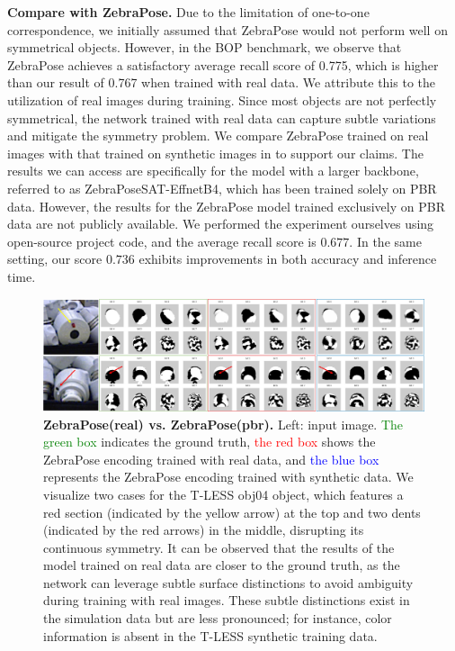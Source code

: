 \textbf{Compare with ZebraPose.} Due to the limitation of one-to-one correspondence, we initially assumed that ZebraPose would not perform well on symmetrical objects. However, in the BOP benchmark, we observe that ZebraPose achieves a satisfactory average recall score of 0.775, which is higher than our result of 0.767 when trained with real data. We attribute this to the utilization of real images during training. Since most objects are not perfectly symmetrical, the network trained with real data can capture subtle variations and mitigate the symmetry problem. We compare ZebraPose trained on real images with that trained on synthetic images in  to support our claims. The results we can access are specifically for the model with a larger backbone, referred to as ZebraPoseSAT-EffnetB4, which has been trained solely on PBR data. However, the results for the ZebraPose model trained exclusively on PBR data are not publicly available. We performed the experiment ourselves using open-source project code, and the average recall score is $0.677$. In the same setting, our score $0.736$ exhibits improvements in both accuracy and inference time.
\begin{figure}[ht]
        \centerline{\includegraphics[width=1.0\textwidth]{figure/symnet/vis_zebrapose_gt_real_pbr_support.jpg}}
        \caption{\textbf{ZebraPose(real) vs. ZebraPose(pbr).} Left: input image. \textcolor{green}{The green box} indicates the ground truth, \textcolor{red}{the red box} shows the ZebraPose encoding trained with real data, and \textcolor{blue}{the blue box} represents the ZebraPose encoding trained with synthetic data. We visualize two cases for the T-LESS obj04 object, which features a red section (indicated by the yellow arrow) at the top and two dents (indicated by the red arrows) in the middle, disrupting its continuous symmetry. It can be observed that the results of the model trained on real data are closer to the ground truth, as the network can leverage subtle surface distinctions to avoid ambiguity during training with real images. These subtle distinctions exist in the simulation data but are less pronounced; for instance, color information is absent in the T-LESS synthetic training data.}
        \label{fig:vis_zebrapose_gt_real_pbr_support}
\end{figure}

